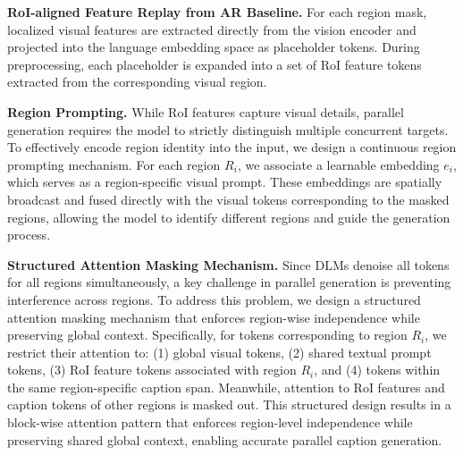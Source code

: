 \noindent
\textbf{RoI-aligned Feature Replay from AR Baseline.} 
%
For each region mask, localized visual features are extracted directly from the vision encoder and projected into the language embedding space as placeholder tokens. During preprocessing, each placeholder is expanded into a set of RoI feature tokens extracted from the corresponding visual region.

\noindent
\textbf{Region Prompting.}
While RoI features capture visual details, parallel generation requires the model to strictly distinguish multiple concurrent targets. To effectively encode region identity into the input, we design a continuous region prompting mechanism. 
%
For each region $R_i$, we associate a learnable embedding $e_i$, which serves as a region-specific visual prompt. 
%
These embeddings are spatially broadcast and fused directly with the visual tokens corresponding to the masked regions, allowing the model to identify different regions and guide the generation process.


\noindent
\textbf{Structured Attention Masking Mechanism.}
Since DLMs denoise all tokens for all regions simultaneously, a key challenge in parallel generation is preventing interference across regions. 
%
To address this problem, we design a structured attention masking mechanism that enforces region-wise independence while preserving global context. Specifically, for tokens corresponding to region $R_i$, we restrict their attention to: (1) global visual tokens, (2) shared textual prompt tokens, (3) RoI feature tokens associated with region $R_i$, and (4) tokens within the same region-specific caption span. Meanwhile, attention to RoI features and caption tokens of other regions is masked out. This structured design results in a block-wise attention pattern that enforces region-level independence while preserving shared global context, enabling accurate parallel caption generation.

